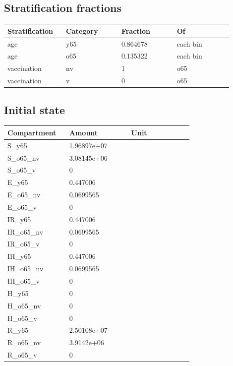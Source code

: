 \documentclass{article}
\begin{document}
\subsection*{Stratification fractions}
\begin{longtable}{p{0.225\linewidth}p{0.225\linewidth}p{0.225\linewidth}p{0.225\linewidth}}
Stratification & Category & Fraction & Of \\
\hline
\endhead
age & y65 & 0.864678 & each bin \\
age & o65 & 0.135322 & each bin \\
vaccination & nv & 1 & o65 \\
vaccination & v & 0 & o65 \\
\end{longtable}
\subsection*{Initial state}
\begin{longtable}{p{0.3\linewidth}p{0.3\linewidth}p{0.3\linewidth}}
Compartment & Amount & Unit \\
\hline
\endhead
S\_y65 & 1.96897e+07 &  \\
S\_o65\_nv & 3.08145e+06 &  \\
S\_o65\_v & 0 &  \\
E\_y65 & 0.447006 &  \\
E\_o65\_nv & 0.0699565 &  \\
E\_o65\_v & 0 &  \\
IR\_y65 & 0.447006 &  \\
IR\_o65\_nv & 0.0699565 &  \\
IR\_o65\_v & 0 &  \\
IH\_y65 & 0.447006 &  \\
IH\_o65\_nv & 0.0699565 &  \\
IH\_o65\_v & 0 &  \\
H\_y65 & 0 &  \\
H\_o65\_nv & 0 &  \\
H\_o65\_v & 0 &  \\
R\_y65 & 2.50108e+07 &  \\
R\_o65\_nv & 3.9142e+06 &  \\
R\_o65\_v & 0 &  \\
\end{longtable}
\end{document}
